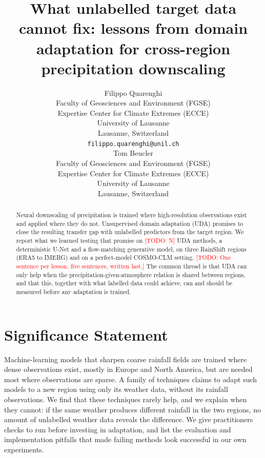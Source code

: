 \documentclass{article}
\title{What unlabelled target data cannot fix: lessons from domain
adaptation for cross-region precipitation downscaling}
\author{
    Filippo Quarenghi \\
    Faculty of Geosciences and Environment (FGSE)\\
    Expertise Center for Climate Extremes (ECCE)\\
    University of Lausanne \\
    Lausanne, Switzerland \\
    \texttt{filippo.quarenghi@unil.ch} \\
        \And
    Tom Beucler \\
    Faculty of Geosciences and Environment (FGSE)\\
    Expertise Center for Climate Extremes (ECCE)\\
    University of Lausanne\\
    Lausanne, Switzerland\\
}
\date{}
\newcommand{\todo}[1]{\textcolor{red}{[TODO: #1]}}
\begin{document}
\maketitle

\begin{abstract}
Neural downscaling of precipitation is trained where high-resolution
observations exist and applied where they do not. Unsupervised domain
adaptation (UDA) promises to close the resulting transfer gap with
unlabelled predictors from the target region. We report what we learned
testing that promise on \todo{N} UDA methods, a deterministic U-Net and a
flow-matching generative model, on three RainShift regions (ERA5 to
IMERG) and on a perfect-model COSMO-CLM setting. \todo{One sentence per
lesson, five sentences, written last.} The common thread is that UDA can
only help when the precipitation-given-atmosphere relation is shared
between regions, and that this, together with what labelled data could
achieve, can and should be measured before any adaptation is trained.
\end{abstract}


\section*{Significance Statement}
Machine-learning models that sharpen coarse rainfall fields are trained
where dense observations exist, mostly in Europe and North America, but
are needed most where observations are sparse. A family of techniques
claims to adapt such models to a new region using only its weather data,
without its rainfall observations. We find that these techniques rarely
help, and we explain when they cannot: if the same weather produces
different rainfall in the two regions, no amount of unlabelled weather
data reveals the difference. We give practitioners checks to run before
investing in adaptation, and list the evaluation and implementation
pitfalls that made failing methods look successful in our own
experiments.
\end{document}
